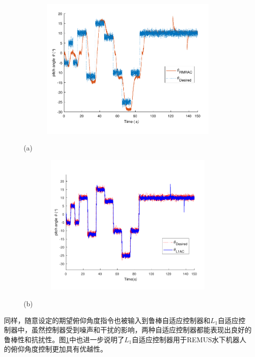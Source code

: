
\begin{figure}[H]
\centering
\begin{minipage}{0.9\linewidth}
  \centerline{\includegraphics[width=12.0cm,height = 7cm]{figure/chap5/6dof/RMRAC/RMRA_x.pdf}}
  \centerline{(a) }
\end{minipage}
\vfill
\begin{minipage}{0.9\linewidth}
  \centerline{\includegraphics[width=12.0cm,height = 7cm]{figure/chap5/6dof/L1AC/L1AC_x.pdf}}
  \centerline{(b) }
\end{minipage}
\label{fig:chap5:F10}
\end{figure}


同样，随意设定的期望俯仰角度指令也被输入到鲁棒自适应控制器和$L_1$自适应控制器中，虽然控制器受到噪声和干扰的影响，两种自适应控制器都能表现出良好的鲁棒性和抗扰性。图\ref{fig:chap5:F10}中也进一步说明了$L_1$自适应控制器用于REMUS水下机器人的俯仰角度控制更加具有优越性。


